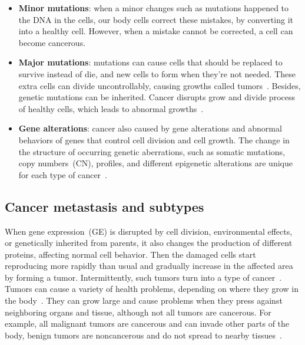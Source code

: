 \begin{itemize}[noitemsep]
    \item \textbf{Minor mutations}: when a minor changes such as mutations happened to the DNA in the cells, our body cells correct these mistakes, by converting it into a healthy cell. However, when a mistake cannot be corrected, a cell can become cancerous. 
    \item \textbf{Major mutations}: mutations can cause cells that should be replaced to survive instead of die, and new cells to form when they're not needed. These extra cells can divide uncontrollably, causing growths called tumors~\cite{82Tomczak}. Besides, genetic mutations can be inherited. Cancer disrupts grow and divide process of healthy cells, which leads to abnormal growths~\cite{pancan}. 
    \item \textbf{Gene alterations}: cancer also caused by gene alterations and abnormal behaviors of genes that control cell division and cell growth. The change in the structure of occurring genetic aberrations, such as somatic mutations, copy numbers~(CN), profiles, and different epigenetic alterations are unique for each type of cancer~\cite{82Tomczak,13cancerdef,19Cruz}. 
\end{itemize}

\subsection{Cancer metastasis and subtypes}
When gene expression~(GE) is disrupted by cell division, environmental effects, or genetically inherited from parents, it also changes the production of different proteins, affecting normal cell behavior. Then the damaged cells start reproducing more rapidly than usual and gradually increase in the affected area by forming a tumor. Intermittently, such tumors turn into a type of cancer~\cite{zuo2019identification,24Podolsky}. Tumors can cause a variety of health problems, depending on where they grow in the body~\cite{zuo2019identification}. They can grow large and cause problems when they press against neighboring organs and tissue, although not all tumors are cancerous. For example, all malignant tumors are cancerous and can invade other parts of the body, benign tumors are noncancerous and do not spread to nearby tissues~\cite{13cancerdef}. 


